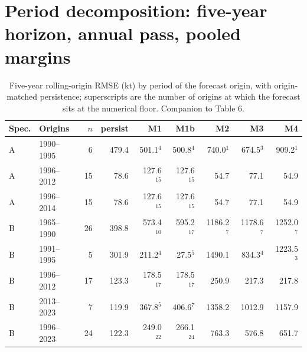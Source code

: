 \documentclass[preprint,11pt,authoryear]{elsarticle}
\theoremstyle{remark}
\begin{document}
\FloatBarrier
\section{Period decomposition: five-year horizon, annual pass, pooled margins}\label{si:periods}

\begin{table}[!htb]
\centering\small
\caption{Five-year rolling-origin RMSE (kt) by period of the forecast origin, with origin-matched persistence; superscripts are the number of origins at which the forecast sits at the numerical floor. Companion to Table 6.}
\label{tab:si_h5}
\begin{tabular}{@{}llrrrrrrr@{}}
\toprule
Spec. & Origins & $n$ & persist & M1 & M1b & M2 & M3 & M4 \\
\midrule
A & 1990--1995 & 6 & 479.4 & 501.1$^{4}$ & 500.8$^{4}$ & 740.0$^{1}$ & 674.5$^{3}$ & 909.2$^{1}$ \\
A & 1996--2012 & 15 & 78.6 & 127.6$^{15}$ & 127.6$^{15}$ & 54.7 & 77.1 & 54.9 \\
A & 1996--2014 & 15 & 78.6 & 127.6$^{15}$ & 127.6$^{15}$ & 54.7 & 77.1 & 54.9 \\
\midrule
B & 1965--1990 & 26 & 398.8 & 573.4$^{10}$ & 595.2$^{17}$ & 1186.2$^{7}$ & 1178.6$^{7}$ & 1252.0$^{7}$ \\
B & 1991--1995 & 5 & 301.9 & 211.2$^{4}$ & 27.5$^{5}$ & 1490.1 & 834.3$^{4}$ & 1223.5$^{3}$ \\
B & 1996--2012 & 17 & 123.3 & 178.5$^{17}$ & 178.5$^{17}$ & 250.9 & 217.3 & 217.8 \\
B & 2013--2023 & 7 & 119.9 & 367.8$^{5}$ & 406.6$^{7}$ & 1358.2 & 1012.9 & 1157.9 \\
B & 1996--2023 & 24 & 122.3 & 249.0$^{22}$ & 266.1$^{24}$ & 763.3 & 576.8 & 651.7 \\
\bottomrule
\end{tabular}
\end{table}
\end{document}
